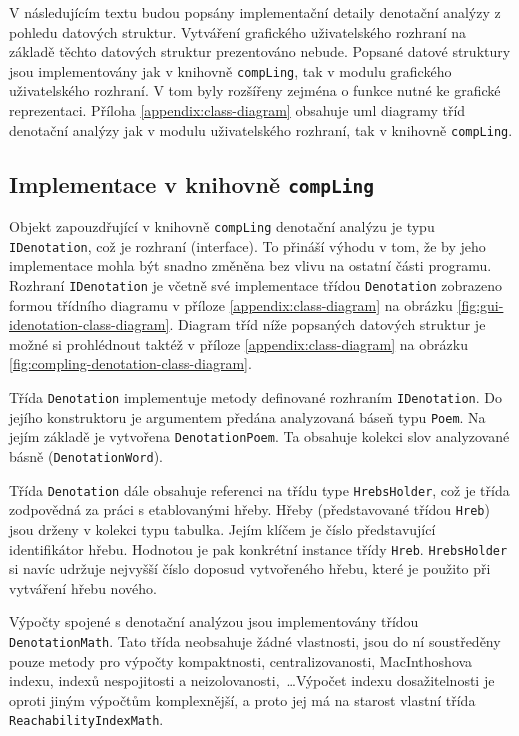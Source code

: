 \documentclass[dp.tex]{subfiles}
\begin{document}
V následujícím textu budou popsány implementační detaily denotační analýzy z pohledu datových struktur. Vytváření grafického uživatelského rozhraní na základě těchto datových struktur prezentováno nebude. Popsané datové struktury jsou implementovány jak v knihovně \texttt{compLing}, tak v modulu grafického uživatelského rozhraní. V tom byly rozšířeny zejména o funkce nutné ke grafické reprezentaci. Příloha \ref{appendix:class-diagram} obsahuje \acrshort{uml} diagramy tříd denotační analýzy jak v modulu uživatelského rozhraní, tak v knihovně \texttt{compLing}.

\subsection{Implementace v knihovně \texttt{compLing}}

Objekt zapouzdřující v knihovně \texttt{compLing} denotační analýzu je typu \texttt{IDenotation}, což je rozhraní (interface). To přináší výhodu v tom, že by jeho implementace mohla být snadno změněna bez vlivu na ostatní části programu. Rozhraní \texttt{IDenotation} je včetně své implementace třídou \texttt{Denotation} zobrazeno formou třídního diagramu v příloze \ref{appendix:class-diagram} na obrázku \ref{fig:gui-idenotation-class-diagram}. Diagram tříd níže popsaných datových struktur je možné si prohlédnout taktéž v příloze \ref{appendix:class-diagram} na obrázku \ref{fig:compling-denotation-class-diagram}.

Třída \texttt{Denotation} implementuje metody definované rozhraním \texttt{IDenotation}. Do jejího konstruktoru je argumentem předána analyzovaná báseň typu \texttt{Poem}. Na jejím základě je vytvořena \texttt{DenotationPoem}. Ta obsahuje kolekci slov analyzované básně (\texttt{DenotationWord}). 

Třída \texttt{Denotation} dále obsahuje referenci na třídu type \texttt{HrebsHolder}, což je třída zodpovědná za práci s etablovanými hřeby. Hřeby (představované třídou \texttt{Hreb}) jsou drženy v kolekci typu tabulka. Jejím klíčem je číslo představující identifikátor hřebu. Hodnotou je pak konkrétní instance třídy \texttt{Hreb}. \texttt{HrebsHolder} si navíc udržuje nejvyšší číslo doposud vytvořeného hřebu, které je použito při vytváření hřebu nového.

Výpočty spojené s denotační analýzou jsou implementovány třídou \texttt{DenotationMath}. Tato třída neobsahuje žádné vlastnosti, jsou do ní soustředěny pouze metody pro \mbox{výpočty} kompaktnosti, centralizovanosti, MacInthoshova indexu, indexů nespojitosti a neizolovanosti,~\ldots Výpočet indexu dosažitelnosti je oproti jiným výpočtům komplexnější, a proto jej má na starost vlastní třída \texttt{ReachabilityIndexMath}.
\end{document}
